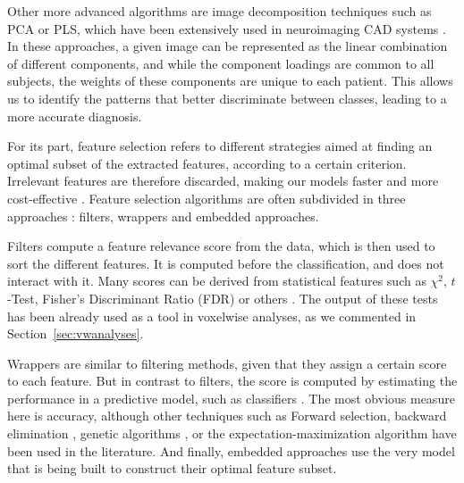 Other more advanced algorithms are image decomposition techniques such as \ac{PCA} or \ac{PLS}, which have been extensively used in neuroimaging \ac{CAD} systems \cite{Spetsieris2009,Illan2011,Towey2011,Segovia2013,Khedher2015}. In these approaches, a given image can be represented as the linear combination of different components, and while the component loadings are common to all subjects, the weights of these components are unique to each patient. This allows us to identify the patterns that better discriminate between classes, leading to a more accurate diagnosis. 

For its part, feature selection refers to different strategies aimed at finding an optimal subset of the extracted features, according to a certain criterion. Irrelevant features are therefore discarded, making our models faster and more cost-effective \cite{Guyon03}. Feature selection algorithms are often subdivided in three approaches \cite{Martinez-Murcia2016b}: filters, wrappers and embedded approaches. 

Filters compute a feature relevance score from the data, which is then used to sort the different features. It is computed before the classification, and does not interact with it. Many scores can be derived from statistical features such as $\chi^2$, $t$-Test, Fisher's Discriminant Ratio (FDR) or others \cite{Martinez-Murcia2013255,Martinez-Murcia2016b}. The output of these tests has been already used as a tool in voxelwise analyses, as we commented in Section~\ref{sec:vwanalyses}. 

Wrappers are similar to filtering methods, given that they assign a certain score to each feature. But in contrast to filters, the score is computed by estimating the performance in a predictive model, such as classifiers \cite{Kohavi1995}. The most obvious measure here is accuracy, although other techniques such as Forward selection, backward elimination \cite{Guyon03}, genetic algorithms  \cite{Kohavi1995}, or the expectation-maximization algorithm \cite{Gorriz2009} have been used in the literature. And finally, embedded approaches use the very model that is being built to construct their optimal feature subset. 
